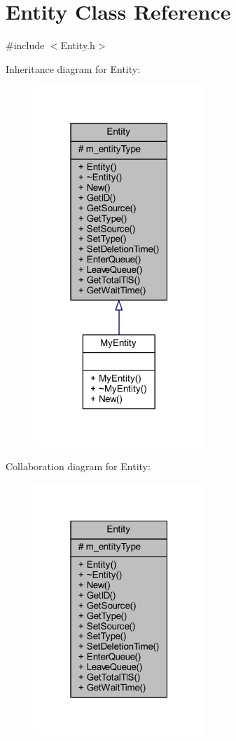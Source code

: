 \hypertarget{class_entity}{}\section{Entity Class Reference}
\label{class_entity}


{\ttfamily \#include $<$Entity.\+h$>$}



Inheritance diagram for Entity\+:\nopagebreak
\begin{figure}[H]
\begin{center}
\leavevmode
\includegraphics[width=183pt]{class_entity__inherit__graph}
\end{center}
\end{figure}


Collaboration diagram for Entity\+:\nopagebreak
\begin{figure}[H]
\begin{center}
\leavevmode
\includegraphics[width=183pt]{class_entity__coll__graph}
\end{center}
\end{figure}
